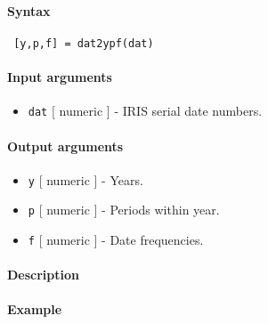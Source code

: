 


	\paragraph{Syntax}
 
 \begin{verbatim}
 [y,p,f] = dat2ypf(dat)
 \end{verbatim}
 
 \paragraph{Input arguments}
 
 \begin{itemize}
 \item
   \texttt{dat} {[} numeric {]} - IRIS serial date numbers.
 \end{itemize}
 
 \paragraph{Output arguments}
 
 \begin{itemize}
 \item
   \texttt{y} {[} numeric {]} - Years.
 \item
   \texttt{p} {[} numeric {]} - Periods within year.
 \item
   \texttt{f} {[} numeric {]} - Date frequencies.
 \end{itemize}
 
 \paragraph{Description}
 
 \paragraph{Example}



